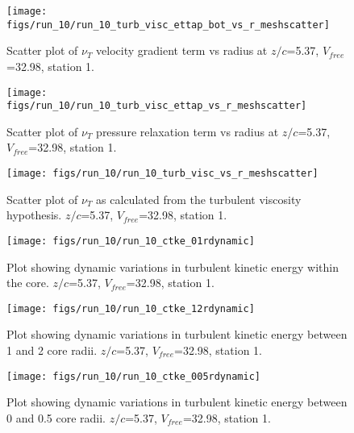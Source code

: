 \begin{figure}[H]
\centering
\texttt{[image: figs/run\_10/run\_10\_turb\_visc\_ettap\_bot\_vs\_r\_meshscatter]}
\caption{Scatter plot of $\nu_T$ velocity gradient term vs radius at $z/c$=5.37, $V_{free}$=32.98, station 1.}
\end{figure}


\begin{figure}[H]
\centering
\texttt{[image: figs/run\_10/run\_10\_turb\_visc\_ettap\_vs\_r\_meshscatter]}
\caption{Scatter plot of $\nu_T$ pressure relaxation term vs radius at $z/c$=5.37, $V_{free}$=32.98, station 1.}
\end{figure}


\begin{figure}[H]
\centering
\texttt{[image: figs/run\_10/run\_10\_turb\_visc\_vs\_r\_meshscatter]}
\caption{Scatter plot of $\nu_T$ as calculated from the turbulent viscosity hypothesis. $z/c$=5.37, $V_{free}$=32.98, station 1.}
\end{figure}


\begin{figure}[H]
\centering
\texttt{[image: figs/run\_10/run\_10\_ctke\_01rdynamic]}
\caption{Plot showing dynamic variations in turbulent kinetic energy within the core. $z/c$=5.37, $V_{free}$=32.98, station 1.}
\end{figure}


\begin{figure}[H]
\centering
\texttt{[image: figs/run\_10/run\_10\_ctke\_12rdynamic]}
\caption{Plot showing dynamic variations in turbulent kinetic energy between 1 and 2 core radii. $z/c$=5.37, $V_{free}$=32.98, station 1.}
\end{figure}


\begin{figure}[H]
\centering
\texttt{[image: figs/run\_10/run\_10\_ctke\_005rdynamic]}
\caption{Plot showing dynamic variations in turbulent kinetic energy between 0 and 0.5 core radii. $z/c$=5.37, $V_{free}$=32.98, station 1.}
\end{figure}


